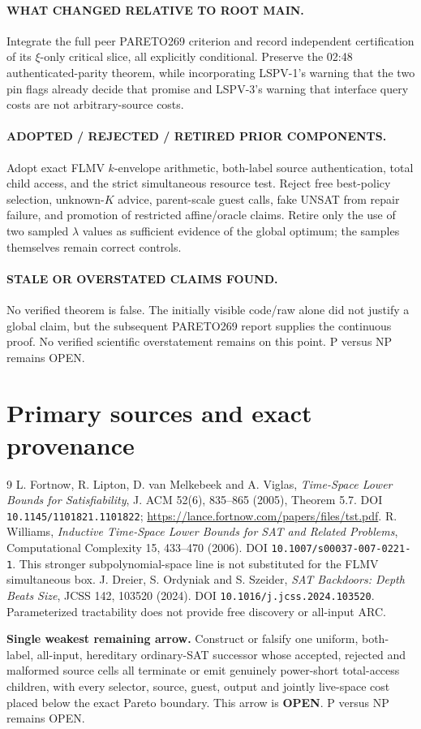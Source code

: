 \documentclass[11pt]{article}
\newcommand{\OPEN}{\textbf{OPEN}}
\begin{document}
\paragraph{WHAT CHANGED RELATIVE TO ROOT MAIN.}
Integrate the full peer PARETO269 criterion and record independent certification
of its $\xi$-only critical slice, all explicitly conditional.  Preserve the
02:48 authenticated-parity theorem, while incorporating LSPV-1's
warning that the two pin flags already decide that promise and LSPV-3's warning
that interface query costs are not arbitrary-source costs.

\paragraph{ADOPTED / REJECTED / RETIRED PRIOR COMPONENTS.}
Adopt exact FLMV $k$-envelope arithmetic, both-label source authentication,
total child access, and the strict simultaneous resource test.  Reject free
best-policy selection, unknown-$K$ advice, parent-scale guest calls, fake UNSAT
from repair failure, and promotion of restricted affine/oracle claims.  Retire
only the use of two sampled $\lambda$ values as sufficient evidence of the
global optimum; the samples themselves remain correct controls.

\paragraph{STALE OR OVERSTATED CLAIMS FOUND.}
No verified theorem is false.  The initially visible code/raw alone did not
justify a global claim, but the subsequent PARETO269 report supplies the
continuous proof.  No verified scientific overstatement remains on this point.
P versus NP remains OPEN.

\section{Primary sources and exact provenance}
\begin{thebibliography}{9}
L. Fortnow, R. Lipton, D. van Melkebeek and A. Viglas,
\emph{Time-Space Lower Bounds for Satisfiability}, J. ACM 52(6),
835--865 (2005), Theorem 5.7. DOI \texttt{10.1145/1101821.1101822};
\url{https://lance.fortnow.com/papers/files/tst.pdf}.
R. Williams, \emph{Inductive Time-Space Lower Bounds for SAT and Related
Problems}, Computational Complexity 15, 433--470 (2006).
DOI \texttt{10.1007/s00037-007-0221-1}.  This stronger subpolynomial-space
line is not substituted for the FLMV simultaneous box.
J. Dreier, S. Ordyniak and S. Szeider, \emph{SAT Backdoors: Depth Beats
Size}, JCSS 142, 103520 (2024). DOI \texttt{10.1016/j.jcss.2024.103520}.
Parameterized tractability does not provide free discovery or all-input ARC.
\end{thebibliography}

\noindent\textbf{Single weakest remaining arrow.}
Construct or falsify one uniform, both-label, all-input, hereditary ordinary-SAT
successor whose accepted, rejected and malformed source cells all terminate or
emit genuinely power-short total-access children, with every selector, source,
guest, output and jointly live-space cost placed below the exact Pareto boundary.
This arrow is \OPEN.  P versus NP remains OPEN.
\end{document}
